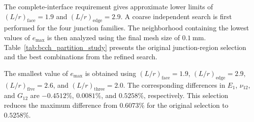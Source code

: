 The complete-interface requirement gives approximate lower limits of $(L/r)_{\mathrm{face}}=1.9$ and $(L/r)_{\mathrm{edge}}=2.9$. A coarse independent search is first performed for the four junction families. The neighborhood containing the lowest values of $e_{\max}$ is then analyzed using the final mesh size of $0.1~\text{mm}$. Table~\ref{tab:bcch_partition_study} presents the original junction-region selection and the best combinations from the refined search.

\begin{table}[H]
\centering
\caption{Influence of the independently selected junction-region dimensions on the effective properties relative to SwiftComp}
\label{tab:bcch_partition_study}
\end{table}

The smallest value of $e_{\max}$ is obtained using $(L/r)_{\mathrm{face}}=1.9$, $(L/r)_{\mathrm{edge}}=2.9$, $(L/r)_{\mathrm{five}}=2.6$, and $(L/r)_{\mathrm{three}}=2.0$. The corresponding differences in $E_1$, $\nu_{12}$, and $G_{12}$ are $-0.4512\%$, $0.0081\%$, and $0.5258\%$, respectively. This selection reduces the maximum difference from $0.6073\%$ for the original selection to $0.5258\%$.


